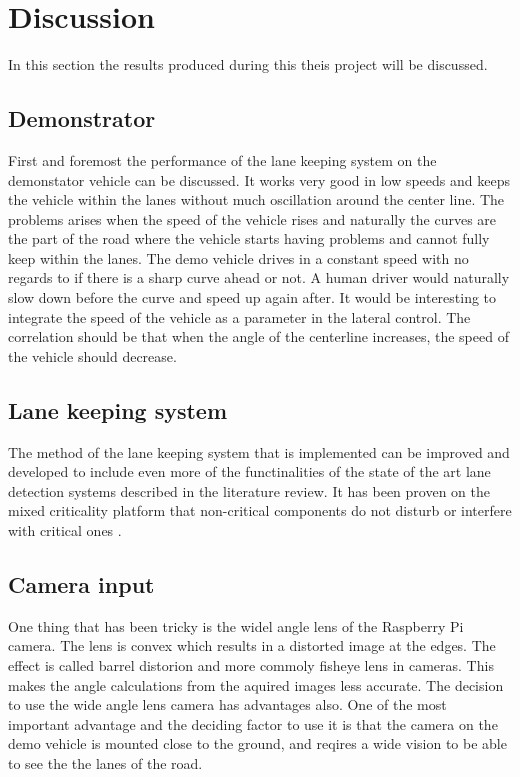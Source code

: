 \chapter{Discussion}
In this section the results produced during this theis project will be discussed.
\section{Demonstrator}
First and foremost the performance of the lane keeping system on the demonstator vehicle can be discussed. It works very good in low speeds and keeps the vehicle within the lanes without much oscillation around the center line. The problems arises when the speed of the vehicle rises and naturally the curves are the part of the road where the vehicle starts having problems and cannot fully keep within the lanes. The demo vehicle drives in a constant speed with no regards to if there is a sharp curve ahead or not. A human driver would naturally slow down before the curve and speed up again after. It would be interesting to integrate the speed of the vehicle as a parameter in the lateral control. The correlation should be that when the angle of the centerline increases, the speed of the vehicle should decrease. \\

\section{Lane keeping system}
The method of the lane keeping system that is implemented can be improved and developed to include even more of the functinalities of the state of the art lane detection systems described in the literature review. It has been proven on the mixed criticality platform that non-critical components do not disturb or interfere with critical ones \cite{zaki2016}.\\

\section{Camera input}
One thing that has been tricky is the widel angle lens of the Raspberry Pi camera. The lens is convex which results in a distorted image at the edges. The effect is called barrel distorion and more commoly fisheye lens in cameras. This makes the angle calculations from the aquired images less accurate. The decision to use the wide angle lens camera has advantages also. One of the most important advantage and the deciding factor to use it is that the camera on the demo vehicle is mounted close to the ground, and reqires a wide vision to be able to see the the lanes of the road.\\

